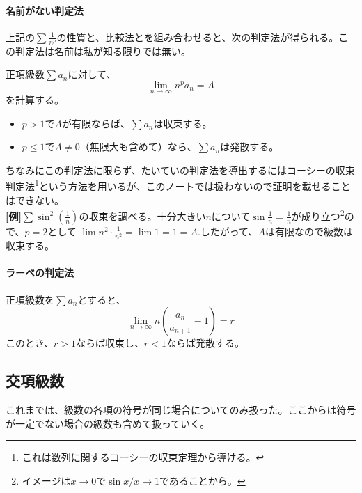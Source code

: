 \documentclass[a4j,dvipdfmx]{jsarticle}
\begin{document}
                \paragraph{名前がない判定法}上記の$\sum \frac{1}{n^p}$の性質と、比較法とを組み合わせると、次の判定法が得られる。この判定法は名前は私が知る限りでは無い。

                正項級数$\sum a_n$に対して、
                \begin{equation}
                    \lim_{n\to\infty}n^p a_n = A \label{eq:名もなき判定法}
                \end{equation}
                を計算する。
                \begin{itemize}
                    \item $p>1$で$A$が有限ならば、$\sum a_n$は収束する。
                    \item $p\leq 1$で$A\neq 0$（無限大も含めて）なら、$\sum a_n$は発散する。
                \end{itemize}
                ちなみにこの判定法に限らず、たいていの判定法を導出するにはコーシーの収束判定法\footnote{これは数列に関するコーシーの収束定理から導ける。}という方法を用いるが、このノートでは扱わないので証明を載せることはできない。\\

                \textbf{[例]}\hspace{1mm}$\sum \sin^2(\frac{1}{n})$の収束を調べる。十分大きい$n$について$\sin \frac{1}{n} = \frac{1}{n}$が成り立つ\footnote{イメージは$x\to 0$で$\sin x/x\to 1$であることから。}ので、$p=2$として
                $\lim n^2\cdot\frac{1}{n^2}=\lim 1=1=A.$したがって、$A$は有限なので級数は収束する。

                \paragraph{ラーベの判定法}正項級数を$\sum a_n$とすると、
                \begin{equation}
                    \lim_{n\to\infty}n\left(\frac{a_n}{a_{n+1}}-1\right)=r \label{eq:ラーベの判定法}
                \end{equation}
                このとき、$r>1$ならば収束し、$r<1$ならば発散する。
            \clearpage
            \subsection{交項級数}
                これまでは、級数の各項の符号が同じ場合についてのみ扱った。ここからは符号が一定でない場合の級数も含めて扱っていく。
\end{document}
